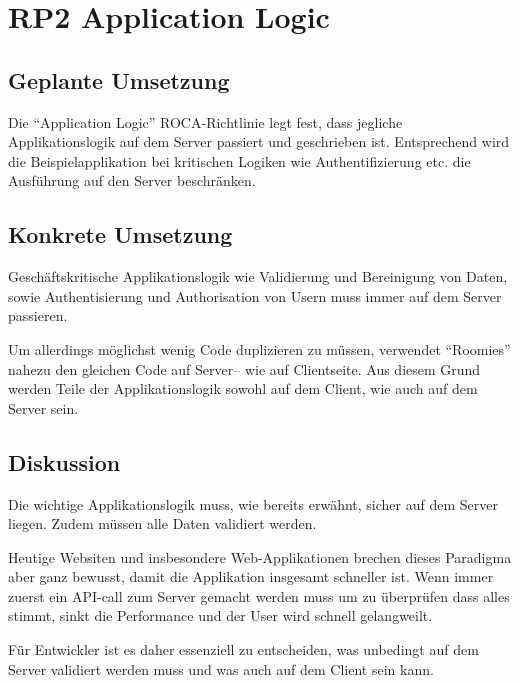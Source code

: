 \section{RP2 Application Logic}
\label{sec:principle-rp2-application-logic}

\subsection*{Geplante Umsetzung}
Die ``Application Logic'' ROCA-Richtlinie legt fest, dass jegliche Applikationslogik
auf dem Server passiert und geschrieben ist.
Entsprechend wird die Beispielapplikation bei kritischen Logiken wie Authentifizierung
etc. die Ausführung auf den Server beschränken.

\subsection*{Konkrete Umsetzung}
Geschäftskritische Applikationslogik wie Validierung und Bereinigung von Daten, sowie
Authentisierung und Authorisation von Usern muss immer auf dem Server passieren.

Um allerdings möglichst wenig Code duplizieren zu müssen, verwendet ``Roomies''
nahezu den gleichen Code auf Server-- wie auf Clientseite. Aus diesem Grund werden
Teile der Applikationslogik sowohl auf dem Client, wie auch auf dem Server sein.

\subsection*{Diskussion}
Die wichtige Applikationslogik muss, wie bereits erwähnt, sicher auf dem Server liegen.
Zudem müssen alle Daten validiert werden.

Heutige Websiten und insbesondere Web-Applikationen brechen dieses Paradigma aber
ganz bewusst, damit die Applikation insgesamt schneller ist. Wenn immer zuerst ein
API-call zum Server gemacht werden muss um zu überprüfen dass alles stimmt, sinkt
die Performance und der User wird schnell gelangweilt.

Für Entwickler ist es daher essenziell zu entscheiden, was unbedingt auf dem Server
validiert werden muss und was auch auf dem Client sein kann.